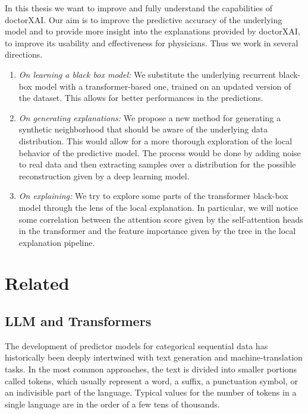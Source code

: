 \documentclass[]{marticle}
\begin{document}
In this thesis we want to improve and fully understand the capabilities of doctorXAI. Our aim is to
improve the predictive accuracy of the underlying model and to provide more insight into the
explanations provided by doctorXAI, to improve its usability and effectiveness for physicians. Thus
we work in several directions.
\begin{enumerate}
\item \emph{On learning a black box model:} We substitute the underlying recurrent black-box model
with a transformer-based one, trained on an updated version of the dataset. This allows for better
performances in the predictions.

\item \emph{On generating explanations:}  We propose a new method for generating a synthetic
neighborhood that should be aware of the underlying data distribution. This would allow for a more
thorough exploration of the local behavior of the predictive model. The process would be done by
adding noise to real data and then extracting samples over a distribution for the possible
reconstruction given by a deep learning model.

\item \emph{On explaining:} We try to explore some parts of the transformer black-box model
through the lens of the local explanation. In particular, we will notice some correlation between the
attention score given by the self-attention heads in the transformer and the feature importance
given by the tree in the local explanation pipeline.
\end{enumerate}

\section{Related}


\subsection{LLM and Transformers}

The development of predictor models for categorical sequential data has historically been deeply
intertwined with text generation and machine-translation tasks. In the most common approaches,
the text is divided into smaller portions called tokens, which usually represent a word, a suffix, a
punctuation symbol, or an indivisible part of the language. Typical values for the number
of tokens in a single language are in the order of a few tens of thousands.
\end{document}
